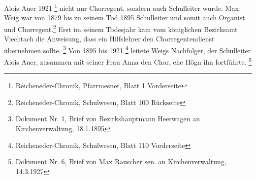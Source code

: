 \documentclass[a4paper]{article}
\newcommand\textstyleFootnoteSymbol[1]{\textsuperscript{#1}}
\newcommand\textstyleFunotenTextZchn[1]{#1}
\begin{document}
Alois Auer 1921 \footnote{Reicheneder-Chronik, Pfarrmesner, Blatt 1
\textstyleFunotenTextZchn{Vorderseite}} nicht nur Chorregent, sondern
auch Schulleiter wurde. Max Weig war von 1879 bis zu seinem Tod 1895
Schulleiter und somit auch Organist und Chorregent.\footnote{
Reicheneder-Chronik, Schulwesen, Blatt 100
Rückseite}\textstyleFootnoteSymbol{ }Erst im seinem Todesjahr kam vom
königlichen Bezirksamt Viechtach die Anweisung, dass ein Hilfslehrer
den Chorregentendienst übernehmen sollte. \footnote{Dokument Nr. 1,
Brief von Bezirkshauptmann Heerwagen an Kirchenverwaltung, 18.1.1895}
Von 1895 bis 1921 \footnote{Reicheneder-Chronik, Schulwesen, Blatt 110
Vorderseite} leitete Weigs Nachfolger, der Schulleiter Alois Auer,
zusammen mit seiner Frau Anna den Chor, ehe Högn ihn
fortführte. \footnote{Dokument Nr. 6, Brief von Max Rauscher sen. an
Kirchenverwaltung, 14.3.1927}
\end{document}
